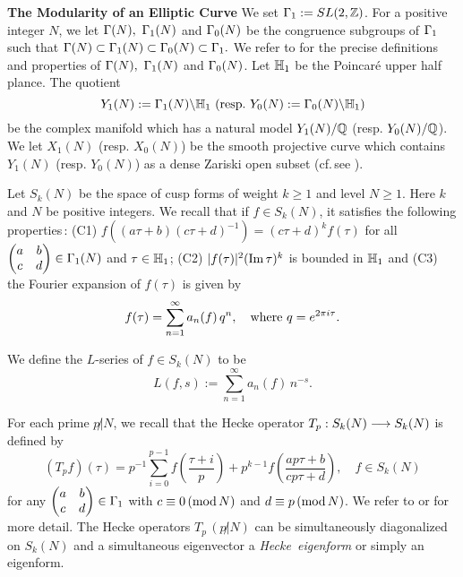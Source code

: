 \documentclass[11pt]{amsart}
\begin{document}
\begin{section}{{\bf The Modularity of an Elliptic Curve}}
\setcounter{equation}{0}
\vskip 3mm
We set $\Gamma_1:=SL(2,\mathbb Z)$. For a positive integer $N$, we let $\Gamma (N),\ \Gamma_1 (N)$ and
$\Gamma_0 (N)$ be the congruence subgroups of $\Gamma_1$ such that $\Gamma (N)\subset \Gamma_1(N)
\subset \Gamma_0 (N)\subset \Gamma_1.$ We refer to \cite[pp.\,13--14,\,p.\,21]{Di-S}
for the precise definitions and properties of $\Gamma (N),\ \Gamma_1 (N)$ and $\Gamma_0 (N)$.
Let $\mathbb H_1$ be the Poincar{\'e} upper half plance. The quotient
\begin{equation*}
  Y_1(N):=\Gamma_1(N)\backslash \mathbb H_1 \ ({\rm resp}.\  Y_0(N):=\Gamma_0(N)\backslash \mathbb H_1)
\end{equation*}
be the complex manifold which has a natural model $Y_1(N)/\mathbb Q$ (resp. $Y_0(N)/\mathbb Q$).
We let $X_1(N)$ (resp. $X_0(N)$) be the smooth projective curve which contains
$Y_1(N)$ (resp. $Y_0(N)$) as a dense Zariski open subset (cf.\,see \cite[pp.\,45--60]{Di-S}).

\vskip 3mm
Let $S_k(N)$ be the space of cusp forms of weight $k\geq 1$ and level $N\geq 1$.
Here $k$ and $N$ be positive integers. We recall that
if $f\in S_k(N)$, it satisfies the following properties\,:
\vskip 2mm
(C1) $f((a\tau+b)(c\tau+d)^{-1})=(c\tau+d)^k f(\tau)$ for all
$\begin{pmatrix}
   a & b \\
   c & d
 \end{pmatrix}\in \Gamma_1(N)$ and $\tau\in \mathbb H_1$;
\vskip 2mm
(C2) $| f(\tau)|^2 ({\rm Im}\,\tau)^k$ is bounded in $\mathbb H_1$ and
\vskip 2mm
(C3) the Fourier expansion of $f(\tau)$ is given by
$$ f(\tau)=\sum_{n=1}^{\infty} a_n (f)\, q^n,\quad {\rm where}\ q=e^{2\pi i\tau}.$$

We define the $L$-series of $f\in S_k(N)$ to be
$$ L(f,s):=\sum_{n=1}^{\infty} a_n (f)\,n^{-s}.$$

\vskip 2mm
For each prime $p\!\not| N$, we recall that the Hecke operator $T_p:S_k(N)\longrightarrow S_k(N)$ is
defined by
\begin{equation*}
  (T_pf)(\tau)=p^{-1}\sum_{i=0}^{p-1} f\left(\frac{\tau+i}{p}\right)
  +p^{k-1} f\left(\frac{ap\tau+b}{cp\tau+d}\right), \quad f\in S_k (N)
\end{equation*}
for any $\begin{pmatrix}
   a & b \\
   c & d
 \end{pmatrix}\in \Gamma_1$ with $c\equiv 0\,({\rm mod}\,N)$ and $d\equiv p\,({\rm mod}\,N)$.
We refer to \cite[p.\,844]{BCDT} or \cite[pp.\,170--171]{Di-S} for more detail. The Hecke
operators $T_p\,(p\!\!\not| N)$ can be simultaneously diagonalized on $S_k (N)$ and
a simultaneous eigenvector a {\it Hecke\ eigenform} or simply an {\sf eigenform}.


\end{section}
\end{document}

